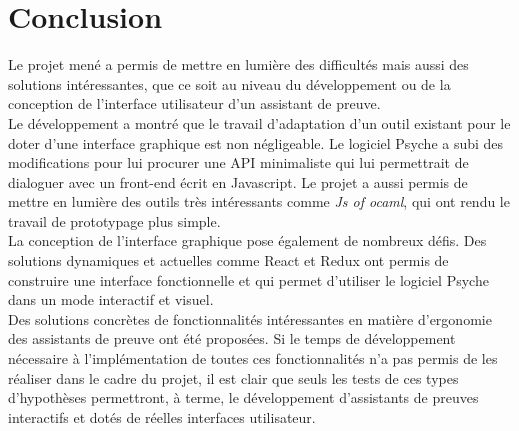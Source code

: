 \section*{Conclusion}

Le projet mené a permis de mettre en lumière des difficultés mais aussi des solutions intéressantes, que ce soit au niveau du développement ou de la conception de l'interface utilisateur d'un assistant de preuve.\\

Le développement a montré que le travail d'adaptation d'un outil existant pour le doter d'une interface graphique est non négligeable. Le logiciel Psyche a subi des modifications pour lui procurer une API minimaliste qui lui permettrait de dialoguer avec un front-end écrit en Javascript. Le projet a aussi permis de mettre en lumière des outils très intéressants comme \textit{Js of ocaml}, qui ont rendu le travail de prototypage plus simple.\\

La conception de l'interface graphique pose également de nombreux défis. Des solutions dynamiques et actuelles comme React et Redux ont permis de construire une interface fonctionnelle et qui permet d'utiliser le logiciel Psyche dans un mode interactif et visuel.\\

Des solutions concrètes de fonctionnalités intéressantes en matière d'ergonomie des assistants de preuve ont été proposées. Si le temps de développement nécessaire à l'implémentation de toutes ces fonctionnalités n'a pas permis de les réaliser dans le cadre du projet, il est clair que seuls les tests de ces types d'hypothèses permettront, à terme, le développement d'assistants de preuves interactifs et dotés de réelles interfaces utilisateur.